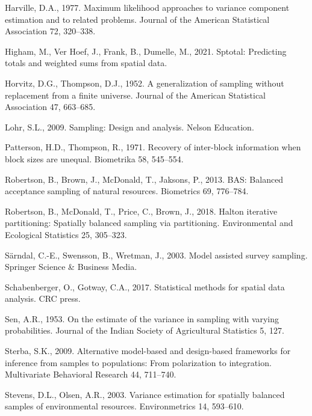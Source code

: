\documentclass[]{elsarticle} %
\begin{document}
\leavevmode\hypertarget{ref-harville1977maximum}{}%
Harville, D.A., 1977. Maximum likelihood approaches to variance
component estimation and to related problems. Journal of the American
Statistical Association 72, 320--338.

\leavevmode\hypertarget{ref-higham2021sptotal}{}%
Higham, M., Ver Hoef, J., Frank, B., Dumelle, M., 2021. Sptotal:
Predicting totals and weighted sums from spatial data.

\leavevmode\hypertarget{ref-horvitz1952generalization}{}%
Horvitz, D.G., Thompson, D.J., 1952. A generalization of sampling
without replacement from a finite universe. Journal of the American
Statistical Association 47, 663--685.

\leavevmode\hypertarget{ref-lohr2009sampling}{}%
Lohr, S.L., 2009. Sampling: Design and analysis. Nelson Education.

\leavevmode\hypertarget{ref-patterson1971recovery}{}%
Patterson, H.D., Thompson, R., 1971. Recovery of inter-block information
when block sizes are unequal. Biometrika 58, 545--554.

\leavevmode\hypertarget{ref-robertson2013bas}{}%
Robertson, B., Brown, J., McDonald, T., Jaksons, P., 2013. BAS: Balanced
acceptance sampling of natural resources. Biometrics 69, 776--784.

\leavevmode\hypertarget{ref-robertson2018halton}{}%
Robertson, B., McDonald, T., Price, C., Brown, J., 2018. Halton
iterative partitioning: Spatially balanced sampling via partitioning.
Environmental and Ecological Statistics 25, 305--323.

\leavevmode\hypertarget{ref-sarndal2003model}{}%
Särndal, C.-E., Swensson, B., Wretman, J., 2003. Model assisted survey
sampling. Springer Science \& Business Media.

\leavevmode\hypertarget{ref-schabenberger2017statistical}{}%
Schabenberger, O., Gotway, C.A., 2017. Statistical methods for spatial
data analysis. CRC press.

\leavevmode\hypertarget{ref-sen1953estimate}{}%
Sen, A.R., 1953. On the estimate of the variance in sampling with
varying probabilities. Journal of the Indian Society of Agricultural
Statistics 5, 127.

\leavevmode\hypertarget{ref-sterba2009alternative}{}%
Sterba, S.K., 2009. Alternative model-based and design-based frameworks
for inference from samples to populations: From polarization to
integration. Multivariate Behavioral Research 44, 711--740.

\leavevmode\hypertarget{ref-stevens2003variance}{}%
Stevens, D.L., Olsen, A.R., 2003. Variance estimation for spatially
balanced samples of environmental resources. Environmetrics 14,
593--610.
\end{document}
